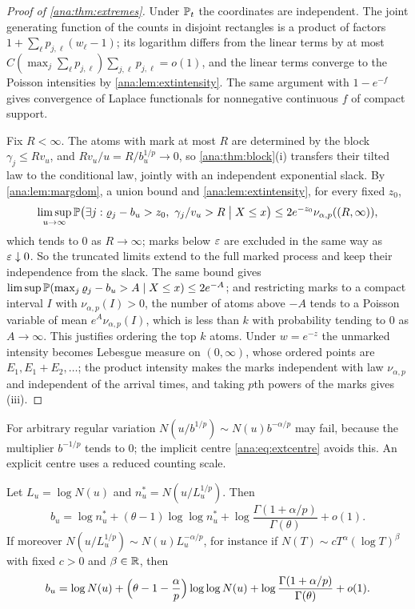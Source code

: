 \begin{proof}[Proof of \cref{ana:thm:extremes}]
Under $\mathbb{P}_t$ the coordinates are independent. The joint generating function of the counts in
disjoint rectangles is a product of factors $1+\sum_\ell p_{j,\ell}(w_\ell-1)$; its logarithm differs
from the linear terms by at most $C(\max_j\sum_\ell p_{j,\ell})\sum_{j,\ell}p_{j,\ell}=o(1)$, and the
linear terms converge to the Poisson intensities by \cref{ana:lem:extintensity}. The same argument with
$1-e^{-f}$ gives convergence of Laplace functionals for nonnegative continuous $f$ of compact support.

Fix $R<\infty$. The atoms with mark at most $R$ are determined by the block $\gamma_j\le Rv_u$, and
$Rv_u/u=R/b_u^{1/p}\to0$, so \cref{ana:thm:block}(i) transfers their tilted law to the conditional law,
jointly with an independent exponential slack. By \cref{ana:lem:margdom}, a union bound and
\cref{ana:lem:extintensity}, for every fixed $z_0$,
\[
 \limsup_{u\to\infty}\mathbb{P}\bigl(\exists j:\varrho_j-b_u>z_0,\ \gamma_j/v_u>R\bigm| X\le x\bigr)
 \le2e^{-z_0}\nu_{\alpha,p}((R,\infty)),
\]
which tends to $0$ as $R\to\infty$; marks below $\varepsilon$ are excluded in the same way as $\varepsilon\downarrow0$.
So the truncated limits extend to the full marked process and keep their independence from the slack.
The same bound gives $\limsup\mathbb{P}(\max_j\varrho_j-b_u>A\mid X\le x)\le2e^{-A}$; and restricting marks to
a compact interval $I$ with $\nu_{\alpha,p}(I)>0$, the number of atoms above $-A$ tends to a Poisson
variable of mean $e^A\nu_{\alpha,p}(I)$, which is less than $k$ with probability tending to $0$ as
$A\to\infty$. This justifies ordering the top $k$ atoms. Under $w=e^{-z}$ the unmarked intensity becomes
Lebesgue measure on $(0,\infty)$, whose ordered points are $E_1,E_1+E_2,\dots$; the product intensity makes
the marks independent with law $\nu_{\alpha,p}$ and independent of the arrival times, and taking $p$th
powers of the marks gives (iii).
\end{proof}

For arbitrary regular variation $N(u/b^{1/p})\sim N(u)b^{-\alpha/p}$ may fail, because the multiplier
$b^{-1/p}$ tends to $0$; the implicit centre \eqref{ana:eq:extcentre} avoids this. An explicit centre
uses a reduced counting scale.

\begin{corollary}\label{ana:cor:extcentre}
Let $L_u=\log N(u)$ and $n_u^*=N(u/L_u^{1/p})$. Then
\[
 b_u=\log n_u^*+(\theta-1)\log\log n_u^*+\log\frac{\Gamma(1+\alpha/p)}{\Gamma(\theta)}+o(1).
\]
If moreover $N(u/L_u^{1/p})\sim N(u)L_u^{-\alpha/p}$, for instance if $N(T)\sim cT^\alpha(\log T)^\beta$ with
fixed $c>0$ and $\beta\in\mathbb{R}$, then
\begin{equation}\label{ana:eq:elemcentre}
 b_u=\log N(u)+\Bigl(\theta-1-\frac\alpha p\Bigr)\log\log N(u)+\log\frac{\Gamma(1+\alpha/p)}{\Gamma(\theta)}+o(1).
\end{equation}
\end{corollary}

